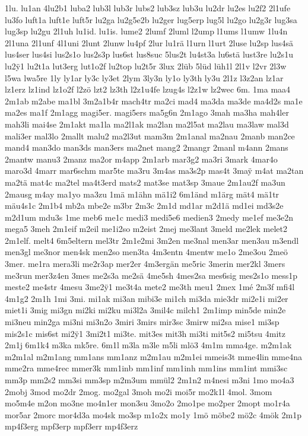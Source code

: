 {1lu.
lu1an
4lu2b1
luba2
lub3l
lub3r
lubs2
lub3sz
lub3u
lu2dr
lu2es
lu2f2
2l1ufe
lu3fo
luft1a
luft1e
luft5r
lu2ga
lu2g5e2b
lu2ger
lug5erp
lug5l
lu2go
lu2g3r
lug3sa
lug3sp
lu2gu
2l1uh
lu1id.
lu1is.
lume2
2lumf
2luml
l2ump
l1ums
l1umw
1lu4n
2l1una
2l1unf
4l1uni
2lunt
2lunw
lu4pf
2lur
lu1rä
l1urn
l1urt
2luse
lu2sp
lus4sä
lus4ser
lus4si
lus2s1o
lus2s3p
lus6st
lus8suc
5lus2t
lu4st3a
lu6stä
lust3re
lu2s1u
lu2^^ff1
lu2t1a
lut3erg
lut1o2f
lu2top
lu2t5r
3lux
2lüb
5lüd
lüh1l
2l1v
l2vr
2l3w
l5wa
lwa5re
1ly
ly1ar
ly3c
ly3et
2lym
3ly3n
ly1o
ly3th
ly3u
2l1z
l3z2an
lz1ar
lz1erz
lz1ind
lz1o2f
l2zö
lzt2
lz3th
l2z1u4fe
lzug4s
l2z1w
lz2wec
6m.
1ma
maa4
2m1ab
m2abe
ma1bl
3m2a1b4r
mach4tr
ma2ci
mad4
ma3da
ma3de
ma4d2s
ma1e
ma2es
ma1f
2m1agg
magi5er.
magi5ers
ma5g6n
2m1ago
3mah
ma3ha
mah4ler
mah3li
mai4se
2m1akt
ma1la
ma2l1ak
ma2lan
ma2l5at
ma2lau
ma3law
mal3d
mali3er
mal3lo
2mallt
malu2
ma2l3ut
mam3m
2m1anal
ma2nau
2manb
man2ce
mand4
man3do
man3ds
man3ers
ma2net
mang2
2mangr
2manl
m4ann
2mans
2mantw
manu3
2manz
ma2or
m4app
2m1arb
mar3g2
ma3ri
3mark
4mar4o
maro3d
4marr
mar6schm
mar5te
ma3ru
3m4as
ma3s2p
mas4t
3ma^^ff
m4at
ma2tan
ma2tä
mat4c
ma2tel
ma4t3erd
mats2
mat3se
mat3sp
3maue
2m1au2f
ma3un
2mausg
m4ay
ma1yo
ma3zu
1mä
m1ähn
mä1i2
6m1änd
m1ärg
mät4
mä1tr
mäu4s1c
2m1b4
mb2a
mbe2e
m3br
2m3c
2m1d
md1ar
m2d1ä
md1ei
md3s2e
m2d1um
mdu3s
1me
meb6
me1c
medi3
medi5e6
medien3
2medy
me1ef
me3e2n
mega5
3meh
2m1eif
m2eil
me1i2so
m2eist
2mej
me3lant
3meld
me2lek
melet2
2m1elf.
melt4
6m5eltern
mel3tr
2m1e2mi
3m2en
me3nal
men3ar
men3au
m3endl
men3gl
me3nor
men4sk
men2so
men3ta
4m3entn
4mentw
me1o
2me3ou
2meö
3mer.
me1ra
mera3li
me2r3ap
mer2er
4m3ergän
me5ric
3merin
mer2kl
3mers
me3run
mer3z4en
3mes
me2s3a
me2sä
4me5sh
4mes2sa
mes6sig
mes2s1o
mess1p
meste2
me4str
4mesu
3me2^^ff1
me3t4a
mete2
me3th
meu1
2mex
1mé
2m3f
mfi4l
4m1g2
2m1h
1mi
3mi.
mi1ak
mi3an
mibi3e
mi1ch
mi3da
mie3dr
mi2e1i
mi2er
miet1i
3mig
mi3gn
mi2ki
mi2ku
mi3l2a
3mil4c
milch1
2m1imp
min5de
min2e
mi3neu
min2ga
mi3ni
mi3n2o
3miri
3mirs
mir3sc
3mirw
mi2sa
mise1
mi3sp
mis2s1c
mis6st
mi2^^ff1
3mi2t1
mi3te.
mit3es
mit3h
mi3ti
mit5s2
mi5tsu
4mitz
2m1j
6m1k4
m3ka
mk5re.
6m1l
m3la
m3le
m5li
mlö3
4m1m
mma4ge.
m2m1ak
m2m1al
m2m1ang
mm1ans
mm1anz
m2m1au
m2m1ei
mmeis3t
mme4lin
mme4na
mme2ra
mme4rec
mmer3k
mm1inb
mm1inf
mm1inh
mm1ins
mm1int
mmi3sc
mm3p
mm2s2
mm3si
mm3sp
m2m3um
mmül2
2m1n2
m4nesi
m3ni
1mo
mo4a3
2mobj
3mod
mo2dr
2mog.
mo2gal
3moh
mo2i
moi5r
mo2k1l
4mol.
3mom
mo5m4e
m2on
mo3ne
mo4n1er
mon3su
3mo2o
2mo1pe
mo2per
2mopt
mo1r4a
mor5ar
2morc
mor4d3a
mo4sk
mo3sp
m1o2x
mo1y
1mö
möbe2
mö2c
4mök
2m1p
mp4f3erg
mpf3erp
mpf3err
mp4f3erz
}
